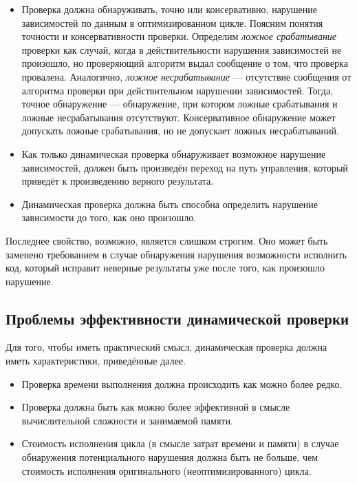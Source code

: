 \begin{itemize}
	\item Проверка должна обнаруживать, точно или консервативно, нарушение зависимостей по данным в оптимизированном цикле. Поясним понятия точности и консервативности проверки. Определим \emph{ложное срабатывание} проверки как случай, когда в действительности нарушения зависимостей не произошло, но проверяющий алгоритм выдал сообщение о том, что проверка провалена. Аналогично, \emph{ложное несрабатывание} --- отсутствие сообщения от алгоритма проверки при действительном нарушении зависимостей. Тогда, точное обнаружение --- обнаружение, при котором ложные срабатывания и ложные несрабатывания отсутствуют. Консервативное обнаружение может допускать ложные срабатывания, но не допускает ложных несрабатываний.
	\item Как только динамическая проверка обнаруживает возможное нарушение зависимостей, должен быть произведён переход на путь управления, который приведёт к произведению верного результата.
	\item Динамическая проверка должна быть способна определить нарушение зависимости до того, как оно произошло.
\end{itemize}

Последнее свойство, возможно, является слишком строгим. Оно может быть заменено требованием в случае обнаружения нарушения возможности исполнить код, который исправит неверные результаты уже после того, как произошло нарушение.

\subsection{Проблемы эффективности динамической проверки}

Для того, чтобы иметь практический смысл, динамическая проверка должна иметь характеристики, приведённые далее.

\begin{itemize}
	\item Проверка времени выполнения должна происходить как можно более редко.
	\item Проверка должна быть как можно более эффективной в смысле вычислительной сложности и занимаемой памяти.
	\item Стоимость исполнения цикла (в смысле затрат времени и памяти) в случае обнаружения потенциального нарушения должна быть не больше, чем стоимость исполнения оригинального (неоптимизированного) цикла.
\end{itemize}

